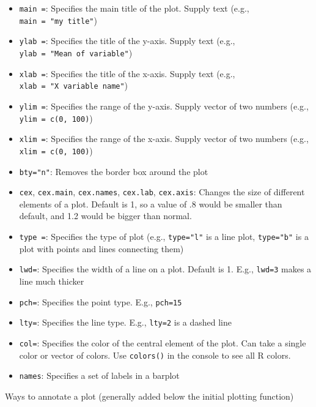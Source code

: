 \documentclass[
  letterpaper,
  DIV=11,
  numbers=noendperiod]{scrreprt}
\providecommand{\tightlist}{%
  \setlength{\itemsep}{0pt}\setlength{\parskip}{0pt}}\usepackage{longtable,booktabs,array}
\begin{document}
\begin{itemize}
\tightlist
\item
  \texttt{main\ =}: Specifies the main title of the plot. Supply text
  (e.g., \texttt{main\ =\ "my\ title"})
\item
  \texttt{ylab\ =}: Specifies the title of the y-axis. Supply text
  (e.g., \texttt{ylab\ =\ "Mean\ of\ variable"})
\item
  \texttt{xlab\ =}: Specifies the title of the x-axis. Supply text
  (e.g., \texttt{xlab\ =\ "X\ variable\ name"})
\item
  \texttt{ylim\ =}: Specifies the range of the y-axis. Supply vector of
  two numbers (e.g., \texttt{ylim\ =\ c(0,\ 100)})
\item
  \texttt{xlim\ =}: Specifies the range of the x-axis. Supply vector of
  two numbers (e.g., \texttt{xlim\ =\ c(0,\ 100)})
\item
  \texttt{bty="n"}: Removes the border box around the plot
\item
  \texttt{cex}, \texttt{cex.main}, \texttt{cex.names}, \texttt{cex.lab},
  \texttt{cex.axis}: Changes the size of different elements of a plot.
  Default is 1, so a value of .8 would be smaller than default, and 1.2
  would be bigger than normal.
\item
  \texttt{type\ =}: Specifies the type of plot (e.g., \texttt{type="l"}
  is a line plot, \texttt{type="b"} is a plot with points and lines
  connecting them)
\item
  \texttt{lwd=}: Specifies the width of a line on a plot. Default is 1.
  E.g., \texttt{lwd=3} makes a line much thicker
\item
  \texttt{pch=}: Specifies the point type. E.g., \texttt{pch=15}
\item
  \texttt{lty=}: Specifies the line type. E.g., \texttt{lty=2} is a
  dashed line
\item
  \texttt{col=}: Specifies the color of the central element of the plot.
  Can take a single color or vector of colors. Use \texttt{colors()} in
  the console to see all R colors.
\item
  \texttt{names}: Specifies a set of labels in a barplot
\end{itemize}

Ways to annotate a plot (generally added below the initial plotting
function)
\end{document}
